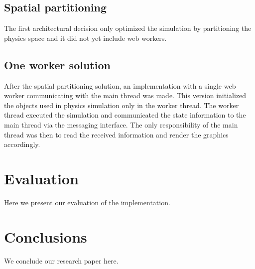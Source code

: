 \documentclass[conference]{IEEEtran}
\begin{document}
\subsection{Spatial partitioning} 
\label{sec:spatial}

The first architectural decision only optimized the simulation by partitioning the physics space and it did not yet include web workers.

\subsection{One worker solution} 
\label{sec:1workers}

After the spatial partitioning solution, an implementation with a single web worker communicating with the main thread was made. This version initialized the objects used
in physics simulation only in the worker thread. The worker thread executed the simulation and communicated the state information to the main thread via the messaging 
interface. The only responsibility of the main thread was then to read the received information and render the graphics accordingly.

\section{Evaluation}
\label{sec:sec2}

Here we present our evaluation of the implementation.

\section{Conclusions}
\label{sec:conc}

We conclude our research paper here.

\printbibliography[title={References}]
\end{document}
